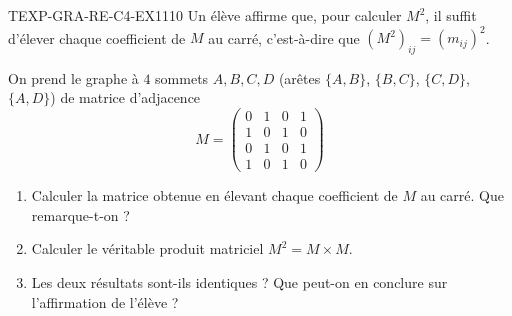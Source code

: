 

\begin{exercice}{TEXP-GRA-RE-C4-EX1}{1}{10}
Un élève affirme que, pour calculer $M^2$, il suffit d'élever chaque coefficient de $M$ au carré, c'est-à-dire que $(M^2)_{ij}=(m_{ij})^2$.

On prend le graphe à $4$ sommets $A,B,C,D$ (arêtes $\{A,B\}$, $\{B,C\}$, $\{C,D\}$, $\{A,D\}$) de matrice d'adjacence
$$M=\begin{pmatrix}0&1&0&1\\1&0&1&0\\0&1&0&1\\1&0&1&0\end{pmatrix}$$
\begin{enumerate}
  \item Calculer la matrice obtenue en élevant chaque coefficient de $M$ au carré. Que remarque-t-on ?
  \item Calculer le véritable produit matriciel $M^2=M\times M$.
  \item Les deux résultats sont-ils identiques ? Que peut-on en conclure sur l'affirmation de l'élève ?
\end{enumerate}
\end{exercice}


